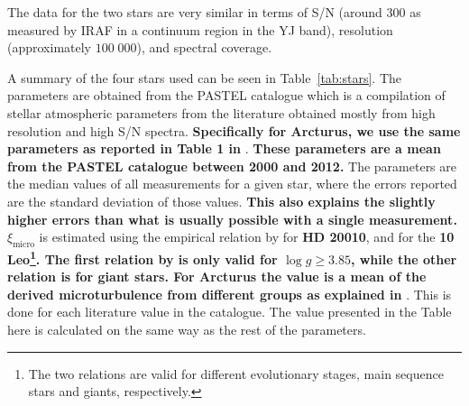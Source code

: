 \documentclass{aa}
\begin{document}
The data for the two stars are very similar in terms of S/N (around 300 as
measured by IRAF in a continuum region in the YJ band), resolution
(approximately $100\;000$), and spectral coverage.

A summary of the four stars used can be seen in Table~\ref{tab:stars}. The parameters are obtained
from the PASTEL catalogue \citep{Soubiran2016} which is a compilation of stellar atmospheric
parameters from the literature obtained mostly from high resolution and high S/N spectra. {\bf
Specifically for Arcturus, we use the same parameters as reported in Table 1 in} \citet{Jofre2014}.
{\bf These parameters are a mean from the PASTEL catalogue between 2000 and 2012.} The parameters
are the median values of all measurements for a given star, where the errors reported are the
standard deviation of those values. {\bf This also explains the slightly higher errors than what is
usually possible with a single measurement.} $\xi_\mathrm{micro}$ is estimated using the empirical
relation by \citet{Tsantaki2013} for {\bf HD 20010}, and \citet{Adibekyan2015} for the {\bf 10
Leo\footnote{The two relations are valid for different evolutionary stages, main sequence stars and
giants, respectively.}. The first relation by \citet{Tsantaki2013} is only valid for $\log
g\ge3.85$, while the other relation is for giant stars. For Arcturus the value is a mean of the
derived microturbulence from different groups as explained in} \citet{Jofre2014}. This is done for
each literature value in the catalogue. The value presented in the Table here is calculated on the
same way as the rest of the parameters.
\end{document}
